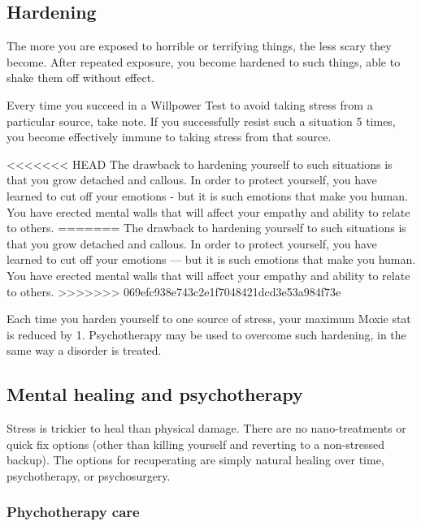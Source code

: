 \subsection{Hardening}
\label{sec:hardening}

The more you are exposed to horrible or terrifying things, the less scary they become. After repeated exposure, you become hardened to such things, able to shake them off without effect.

Every time you succeed in a Willpower Test to avoid taking stress from a particular source, take note. If you successfully resist such a situation 5 times, you become effectively immune to taking stress from that source.

<<<<<<< HEAD
The drawback to hardening yourself to such situations is that you grow detached and callous. In order to protect yourself, you have learned to cut off your emotions - but it is such emotions that make you human. You have erected mental walls that will affect your empathy and ability to relate to others.
=======
The drawback to hardening yourself to such situations is that you grow detached and callous. In order to protect yourself, you have learned to cut off your emotions --- but it is such emotions that make you human. You have erected mental walls that will affect your empathy and ability to relate to others.
>>>>>>> 069efc938e743c2e1f7048421dcd3e53a984f73e

Each time you harden yourself to one source of stress, your maximum Moxie stat is reduced by 1. Psychotherapy may be used to overcome such hardening, in the same way a disorder is treated.


\subsection{Mental healing and psychotherapy}
\label{sec:mental-healing-psychotherapy}

Stress is trickier to heal than physical damage. There are no nano-treatments or quick fix options (other than killing yourself and reverting to a non-stressed backup). The options for recuperating are simply natural healing over time, psychotherapy, or psychosurgery.

\subsubsection{Phychotherapy care}


